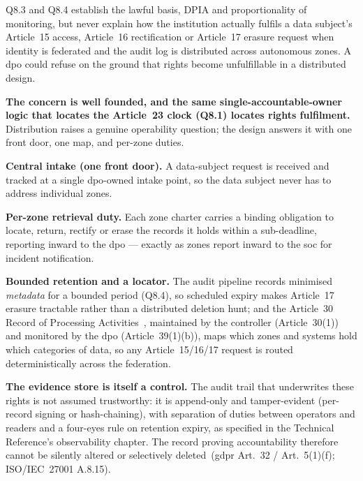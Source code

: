 \bigskip

\begin{questionbox}
Q8.3 and Q8.4 establish the lawful basis, DPIA and proportionality of monitoring, but never explain how the institution actually fulfils a data subject's Article~15 access, Article~16 rectification or Article~17 erasure request when identity is federated and the audit log is distributed across autonomous zones. A \gls{dpo} could refuse on the ground that rights become unfulfillable in a distributed design.
\end{questionbox}

\begin{answerbox}[Answer to Q8.6]
\textbf{The concern is well founded, and the same single-accountable-owner logic that locates the Article~23 clock (Q8.1) locates rights fulfilment.} Distribution raises a genuine operability question; the design answers it with one front door, one map, and per-zone duties.

\medskip\noindent\textbf{Central intake (one front door).} A data-subject request is received and tracked at a single \gls{dpo}-owned intake point, so the data subject never has to address individual zones.

\medskip\noindent\textbf{Per-zone retrieval duty.} Each zone charter carries a binding obligation to locate, return, rectify or erase the records it holds within a sub-deadline, reporting inward to the \gls{dpo} --- exactly as zones report inward to the \gls{soc} for incident notification.

\medskip\noindent\textbf{Bounded retention and a locator.} The audit pipeline records minimised \emph{metadata} for a bounded period (Q8.4), so scheduled expiry makes Article~17 erasure tractable rather than a distributed deletion hunt; and the Article~30 Record of Processing Activities~\cite{gdpr}, maintained by the controller (Article~30(1)) and monitored by the \gls{dpo} (Article~39(1)(b)), maps which zones and systems hold which categories of data, so any Article~15/16/17 request is routed deterministically across the federation.

\medskip\noindent\textbf{The evidence store is itself a control.} The audit trail that underwrites these rights is not assumed trustworthy: it is append-only and tamper-evident (per-record signing or hash-chaining), with separation of duties between operators and readers and a four-eyes rule on retention expiry, as specified in the Technical Reference's observability chapter. The record proving accountability therefore cannot be silently altered or selectively deleted~(\gls{gdpr} Art.~32 / Art.~5(1)(f); ISO/IEC~27001 A.8.15).
\end{answerbox}

